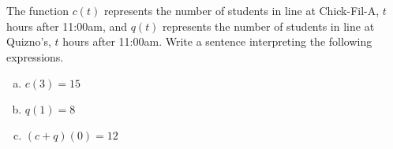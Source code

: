 \documentclass[notes]{subfiles}
\begin{document}
		\begin{ex}
			The function $c(t)$ represents the number of students in line at Chick-Fil-A, $t$ hours after 11:00am, and $q(t)$ represents the number of students in line at Quizno's, $t$ hours after 11:00am.  Write a sentence interpreting the following expressions.
			\begin{enumerate}[(a)]
				\item 
					$c(3) = 15$
					
				\item 
					$q(1) = 8$
					
				\item 
					$(c+q)(0) = 12$

			\end{enumerate}
		\end{ex}
	\clearpage
\end{document}
